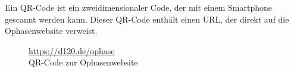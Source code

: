 {Ein QR-Code ist ein zweidimensionaler Code, der mit einem Smartphone gescannt werden kann. Dieser QR-Code enthält einen URL, der direkt auf die Ophasenwebsite verweist.}
{
    \vspace{\fill}
    \begin{figure}[ht!]
        \centering
        \caption*{\large\url{https://d120.de/ophase}\\QR-Code zur Ophasenwebsite}
    \end{figure}
    \vspace{\fill}
}{}

\newpage
